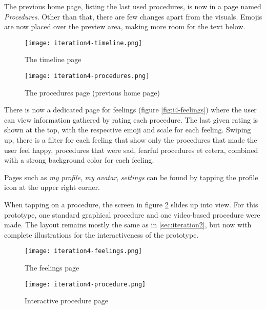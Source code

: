 The previous home page, listing the last used procedures, is now in a page named \emph{Procedures}. Other than that, there are few changes apart from the visuals. Emojis are now placed over the preview area, making more room for the text below.

\begin{figure}
    \centering
    \begin{minipage}{0.45\textwidth}
        \centering
        \texttt{[image: iteration4-timeline.png]}
        \caption{The timeline page}
        \label{fig:i4-timeline}
    \end{minipage}
    \begin{minipage}{0.45\textwidth}
        \centering
        \texttt{[image: iteration4-procedures.png]}
        \caption{The procedures page (previous home page)}
        \label{fig:i4-procedures}
    \end{minipage}
\end{figure}

There is now a dedicated page for feelings (figure \ref{fig:i4-feelings}) where the user can view information gathered by rating each procedure. The last given rating is shown at the top, with the respective emoji and scale for each feeling. Swiping up, there is a filter for each feeling that show only the procedures that made the user feel happy, procedures that were sad, fearful procedures et cetera, combined with a strong background color for each feeling.

Pages such as \emph{my profile}, \emph{my avatar}, \emph{settings} can be found by tapping the profile icon at the upper right corner.

When tapping on a procedure, the screen in figure \ref{fig:i4-procedure} slides up into view. For this prototype, one standard graphical procedure and one video-based procedure were made. The layout remains mostly the same as in \ref{sec:iteration2}, but now with complete illustrations for the interactiveness of the prototype.

\begin{figure}
    \centering
    \begin{minipage}{0.45\textwidth}
        \centering
        \texttt{[image: iteration4-feelings.png]}
        \caption{The feelings page}
        \label{fig:i4-feelings}
    \end{minipage}
    \begin{minipage}{0.45\textwidth}
        \centering
        \texttt{[image: iteration4-procedure.png]}
        \caption{Interactive procedure page}
        \label{fig:i4-procedure}
    \end{minipage}
\end{figure}

